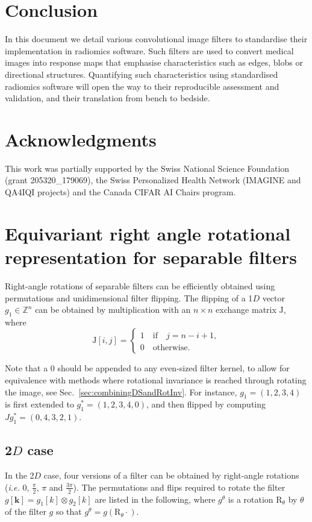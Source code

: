 \documentclass[fleqn,a4paper,oneside,openany]{book}
\begin{document}
\chapter{Conclusion}
In this document we detail various convolutional image filters to standardise their implementation in radiomics software. Such filters are used to convert medical images into response maps that emphasise characteristics such as edges, blobs or directional structures. Quantifying such characteristics using standardised radiomics software will open the way to their reproducible assessment and validation, and their translation from bench to bedside.

\chapter*{Acknowledgments}
This work was partially supported by the Swiss National Science Foundation (grant 205320\_179069), the Swiss Personalized Health Network (IMAGINE and QA4IQI projects) and the Canada CIFAR AI Chairs program.



\appendix
\chapter{Equivariant right angle rotational representation for separable filters} \label{app:separableConvRightAngleEquivariant}
Right-angle rotations of separable filters can be efficiently obtained using permutations and unidimensional filter flipping.
The flipping of a 1$D$ vector $g_1 \in \mathbb{Z}^n$ can be obtained by multiplication with an $n\times n$ exchange matrix $\mathrm{J}$, where 
$$\mathrm{J}[i,j] = \begin{cases}
1\quad \text{if}\quad j=n-i+1,\\
0\quad \text{otherwise}.
\end{cases}$$

Note that a $0$ should be appended to any even-sized filter kernel, to allow for equivalence with methods where rotational invariance is reached through rotating the image, see Sec.~\ref{sec:combiningDSandRotInv}. For instance, $g_1 = (1,2,3,4)$ is first extended to $g_1^{*}=(1,2,3,4,0)$, and then flipped by computing $Jg_1^{*}=(0,4,3,2,1)$.

\section{2$D$ case}
In the 2$D$ case, four versions of a filter can be obtained by right-angle rotations (\textit{i.e.} $0$, $\frac{\pi}{2}$, $\pi$ and $\frac{3\pi}{2}$). The permutations and flips required to rotate the filter $g[\boldsymbol{k}]= g_{1}[k]\otimes g_{2}[k]$ are listed in the following, where $g^{\theta}$ is a rotation $\mathrm{R}_{\theta}$ by $\theta$  of the filter $g$ so that $g^{\theta}=g(\mathrm{R}_{\theta}\cdot)$.
\end{document}
